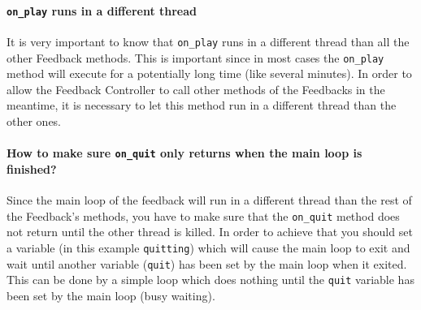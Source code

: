 \paragraph{\lstinline+on_play+ runs in a different thread} It is very important to know that \lstinline+on_play+ runs in a different thread than all the other Feedback methods. This is important since in most cases the \lstinline+on_play+ method will execute for a potentially long time (like several minutes). In order to allow the Feedback Controller to call other methods of the Feedbacks in the meantime, it is necessary to let this method run in a different thread than the other ones.

\paragraph{How to make sure \lstinline+on_quit+ only returns when the main loop is finished?} Since the main loop of the feedback will run in a different thread than the rest of the Feedback's methods, you have to make sure that the \lstinline+on_quit+ method does not return until the other thread is killed. In order to achieve that you should set a variable (in this example \lstinline+quitting+) which will cause the main loop to exit and wait until another variable (\lstinline+quit+) has been set by the main loop when it exited. This can be done by a simple loop which does nothing until the \lstinline+quit+ variable has been set by the main loop (busy waiting).


